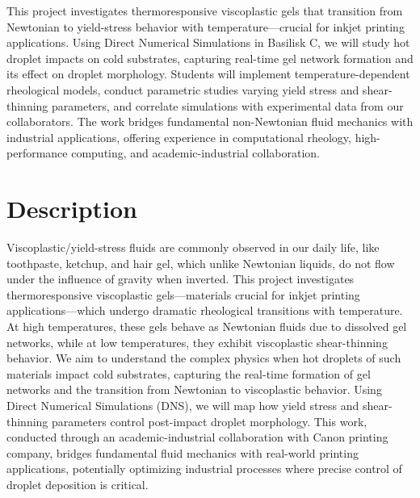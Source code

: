 \documentclass[11pt]{article}
\begin{document}
\begin{tcolorbox}[colback=mgray,colframe=mpurple,title=TL;DR]
This project investigates thermoresponsive viscoplastic gels that transition from Newtonian to yield-stress behavior with temperature—crucial for inkjet printing applications. Using Direct Numerical Simulations in Basilisk C, we will study hot droplet impacts on cold substrates, capturing real-time gel network formation and its effect on droplet morphology. Students will implement temperature-dependent rheological models, conduct parametric studies varying yield stress and shear-thinning parameters, and correlate simulations with experimental data from our collaborators. The work bridges fundamental non-Newtonian fluid mechanics with industrial applications, offering experience in computational rheology, high-performance computing, and academic-industrial collaboration.
\end{tcolorbox}

\section*{Description}
Viscoplastic/yield-stress fluids are commonly observed in our daily life, like toothpaste, ketchup, and hair gel, which unlike Newtonian liquids, do not flow under the influence of gravity when inverted. 
This project investigates thermoresponsive viscoplastic gels—materials crucial for inkjet printing applications—which undergo dramatic rheological transitions with temperature. At high temperatures, these gels behave as Newtonian fluids due to dissolved gel networks, while at low temperatures, they exhibit viscoplastic shear-thinning behavior. We aim to understand the complex physics when hot droplets of such materials impact cold substrates, capturing the real-time formation of gel networks and the transition from Newtonian to viscoplastic behavior.
Using Direct Numerical Simulations (DNS), we will map how yield stress and shear-thinning parameters control post-impact droplet morphology. This work, conducted through an academic-industrial collaboration with Canon printing company, bridges fundamental fluid mechanics with real-world printing applications, potentially optimizing industrial processes where precise control of droplet deposition is critical.
\end{document}
